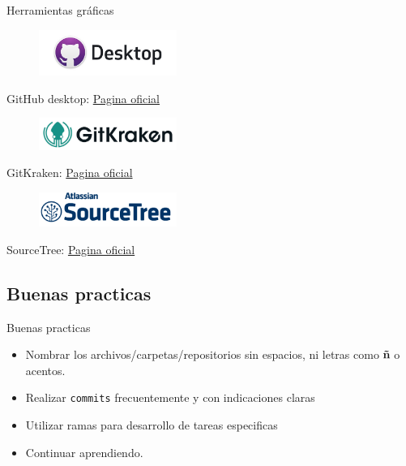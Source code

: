 \documentclass{beamer}
\begin{document}
\begin{frame} {Herramientas gráficas }
\centering 
    \begin{figure}
      \includegraphics[width=0.4\textwidth]{images/github-desktop.jpg}
    \end{figure}
    GitHub desktop: \href{https://desktop.github.com/}{Pagina oficial}

    \begin{figure}
      \includegraphics[width=0.4\textwidth]{images/gitkraken.jpg}
    \end{figure}
    GitKraken: \href{https://www.gitkraken.com/}{Pagina oficial}

    \begin{figure}
      \includegraphics[width=0.4\textwidth]{images/sourcetree.png}
    \end{figure}

    SourceTree: \href{https://www.sourcetreeapp.com/}{Pagina oficial}


\end{frame}

\subsection {Buenas practicas}
  \begin{frame} {Buenas practicas}
      \begin{itemize}
        \Large
        \item Nombrar los archivos/carpetas/repositorios sin espacios, ni letras como \textbf{ñ} o acentos.
        \item Realizar \texttt{commits} frecuentemente y con indicaciones claras 
        \item Utilizar ramas para desarrollo de tareas especificas
        \item Continuar aprendiendo.
      \end{itemize}
  \end{frame}
\end{document}
